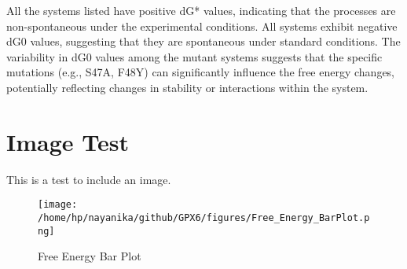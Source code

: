 \documentclass{article}
\begin{document}
All the systems listed have positive dG* values, indicating that the processes are non-spontaneous under the experimental conditions.
All systems exhibit negative dG0 values, suggesting that they are spontaneous under standard conditions.
The variability in dG0 values among the mutant systems suggests that the specific mutations (e.g., S47A, F48Y) can significantly influence the free energy changes, potentially reflecting changes in stability or interactions within the system.



\section{Image Test}
This is a test to include an image.

\begin{figure}[h]
    \centering
    \texttt{[image: /home/hp/nayanika/github/GPX6/figures/Free\_Energy\_BarPlot.png]} %
    \caption{Free Energy Bar Plot}
    \label{fig:free_energy_barplot}
\end{figure}
\end{document}
